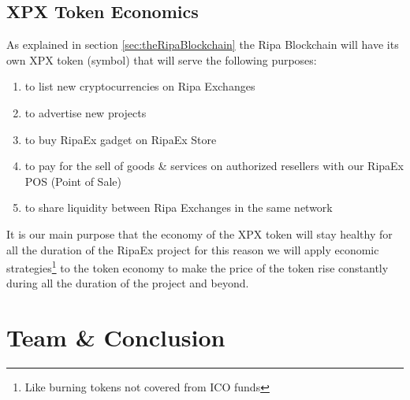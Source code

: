 \documentclass[11pt,fleqn,oneside]{book} %
\begin{document}
\section{XPX Token Economics}
As explained in section \ref{sec:theRipaBlockchain} the Ripa Blockchain will have its own XPX token (\PHP symbol) that 
will serve the following purposes:
	\begin{enumerate}
		\item to list new cryptocurrencies on Ripa Exchanges
		\item to advertise new projects
		\item to buy RipaEx gadget on RipaEx Store
		\item to pay for the sell of goods \& services on authorized resellers with our RipaEx POS (Point of Sale)
		\item to share liquidity between Ripa Exchanges in the same network
	\end{enumerate}
It is our main purpose that the economy of the XPX token will stay healthy for all the duration of the RipaEx project for 
this reason we will apply economic strategies\footnote{Like burning tokens not covered from ICO funds} 
to the token economy to make the price of the token rise constantly during all the duration of the project and beyond.




\chapter{Team \& Conclusion}
\end{document}
